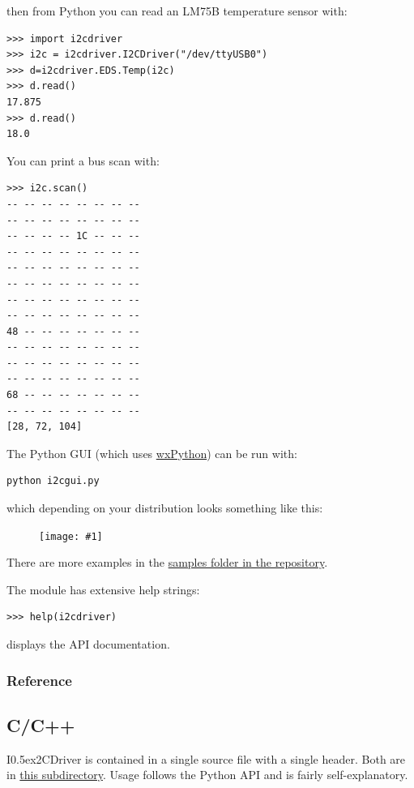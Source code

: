 \documentclass{article}
\newcommand{\two}{\raise0.5ex\hbox{\footnotesize{2}}}
\newcommand{\iicdriver}{I\two{}CDriver}
\newcommand{\png}[1]{
\begin{figure}[H]
\begin{center}
\texttt{[image: \#1]}
\end{center}
\end{figure}
}
\begin{document}
then from Python you can read an LM75B temperature sensor with:

\begin{lstlisting}
>>> import i2cdriver
>>> i2c = i2cdriver.I2CDriver("/dev/ttyUSB0")
>>> d=i2cdriver.EDS.Temp(i2c)
>>> d.read()
17.875
>>> d.read()
18.0
\end{lstlisting}

You can print a bus scan with:

\begin{lstlisting}
>>> i2c.scan()
-- -- -- -- -- -- -- -- 
-- -- -- -- -- -- -- -- 
-- -- -- -- 1C -- -- -- 
-- -- -- -- -- -- -- -- 
-- -- -- -- -- -- -- -- 
-- -- -- -- -- -- -- -- 
-- -- -- -- -- -- -- -- 
-- -- -- -- -- -- -- -- 
48 -- -- -- -- -- -- -- 
-- -- -- -- -- -- -- -- 
-- -- -- -- -- -- -- -- 
-- -- -- -- -- -- -- -- 
68 -- -- -- -- -- -- -- 
-- -- -- -- -- -- -- -- 
[28, 72, 104]
\end{lstlisting}

The Python GUI (which uses \href{https://www.wxpython.org/pages/downloads/}{wxPython}) can be run with:

\begin{lstlisting}
python i2cgui.py
\end{lstlisting}

which depending on your distribution looks something like this:

\png{img/i2cdriver/i2cdriver-gui-linux}

There are more examples in the 
\href{https://github.com/jamesbowman/i2cdriver/tree/master/python/samples}{samples folder in the repository}.

The module has extensive help strings:
\begin{lstlisting}
>>> help(i2cdriver)
\end{lstlisting}
displays the API documentation.

\newpage
\subsubsection{Reference}


\subsection{C/C++}

\iicdriver{} is contained in a single source file with a single header.
Both are in \href{https://github.com/jamesbowman/i2cdriver/tree/master/c/common}{this subdirectory}.
Usage follows the Python API and is fairly self-explanatory.
\end{document}
